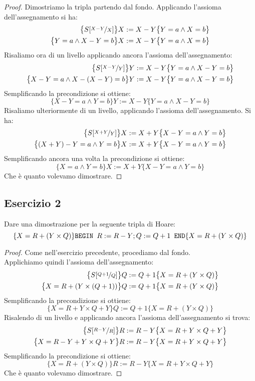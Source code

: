 \begin{proof}
Dimostriamo la tripla partendo dal fondo. Applicando l'assioma dell'assegnamento si ha:
\begin{align*}
  \bigl\{S[\nicefrac{X-Y}{X}] \bigr\} &  X:=X-Y  \bigl\{Y=a  \land  X=b\bigr\}\\
  \bigl\{Y=a  \land X-Y=b \bigr\} & X:=X-Y  \bigl\{Y=a  \land  X=b\bigr\}
\end{align*} 
Risaliamo ora di un livello applicando ancora l'assioma dell'assegnamento:
\begin{align*}
  \bigl\{S[\nicefrac{X-Y}{Y}] \bigr\} & Y:=X-Y \bigl\{Y=a  \land  X-Y=b\bigr\}\\
  \bigl\{X-Y=a  \land X-(X-Y)=b \bigr\} & Y:=X-Y \bigl\{Y=a  \land  X-Y=b\bigr\}
\end{align*}
Semplificando la precondizione si ottiene:
\[ \bigl\{X-Y=a  \land Y=b \bigr\}  Y:=X-Y  \bigl\{Y=a  \land  X-Y=b\bigr\} \]
Risaliamo ulteriormente di un livello, applicando l'assioma dell'assegnamento. Si ha:
\begin{align*}
  \bigl\{S[\nicefrac{X+Y}{Y}] \bigr\} & X:=X+Y \bigl\{X-Y=a  \land  Y=b\bigr\}\\
  \bigl\{(X+Y)-Y=a  \land Y=b \bigr\} & X:=X+Y \bigl\{X-Y=a  \land  Y=b\bigr\}
\end{align*}
Semplificando ancora una volta la precondizione si ottiene:
\[ \bigl\{X=a  \land Y=b \bigr\}  X:=X+Y  \bigl\{X-Y=a  \land  Y=b\bigr\} \]
Che è quanto volevamo dimostrare.
\end{proof}

\subsection{Esercizio 2}
Dare una dimostrazione per la seguente tripla di Hoare:
\[ 
  \{X=R+(Y \times Q) \} \text{\texttt{BEGIN }} R:=R-Y; Q:=Q+1
  \text{\texttt{ END}} \{X=R+(Y \times Q)\} 
\]

\begin{proof}
Come nell'esercizio precedente, procediamo dal fondo.\\
Applichiamo quindi l'assioma dell'assegnamento:
\begin{align*}
  \bigl\{S[\nicefrac{Q+1}{Q}] \bigr\} & Q:=Q+1 \bigl\{X=R+(Y \times Q)\bigr\}\\
  \bigl\{X=R+(Y \times (Q+1)) \bigr\} & Q:=Q+1 \bigl\{X=R+(Y \times Q)\bigr\}
\end{align*}
Semplificando la precondizione si ottiene:
\[ \bigl\{X=R+Y \times Q + Y \bigr\} Q:=Q+1 \bigl\{X=R+(Y \times Q)\bigr\} \]
Risalendo di un livello e applicando ancora l'assioma dell'assegnamento si trova:
\begin{align*}
\bigl\{S[\nicefrac{R-Y}{R}] \bigr\} & R:=R-Y \bigl\{X=R+Y \times Q + Y \bigr\}\\
\bigl\{X= R-Y+Y \times Q+Y \bigr\} & R:=R-Y \bigl\{X=R+Y \times Q + Y \bigr\}
\end{align*}
Semplificando la precondizione si ottiene:
\[ \bigl\{X= R+(Y \times Q) \bigr\} R:=R-Y \bigl\{X=R+Y \times Q + Y \bigr\} \]
Che è quanto volevamo dimostrare.
\end{proof}

